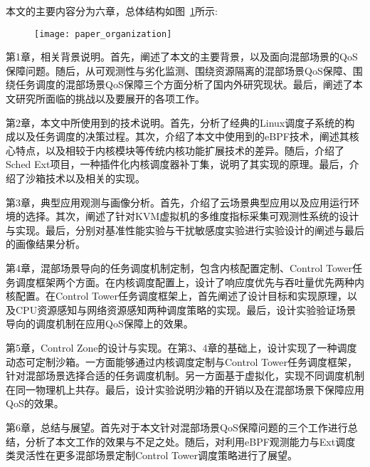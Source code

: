 本文的主要内容分为六章，总体结构如图~\ref{fig:paper_organization}所示:

\begin{figure}[!htbp]
    \centering
    \texttt{[image: paper\_organization]}
    \label{fig:paper_organization}
\end{figure}

第1章，相关背景说明。首先，阐述了本文的主要背景，以及面向混部场景的QoS保障问题。随后，从可观测性与劣化监测、围绕资源隔离的混部场景QoS保障、围绕任务调度的混部场景QoS保障三个方面分析了国内外研究现状。最后，阐述了本文研究所面临的挑战以及要展开的各项工作。

第2章，本文中所使用到的技术说明。首先，分析了经典的Linux调度子系统的构成以及任务调度的决策过程。其次，介绍了本文中使用到的eBPF技术，阐述其核心特点，以及相较于内核模块等传统内核功能扩展技术的差异。随后，介绍了Sched Ext项目，一种插件化内核调度器补丁集，说明了其实现的原理。最后，介绍了沙箱技术以及相关的实现。

第3章，典型应用观测与画像分析。首先，介绍了云场景典型应用以及应用运行环境的选择。其次，阐述了针对KVM虚拟机的多维度指标采集可观测性系统的设计与实现。最后，分别对基准性能实验与干扰敏感度实验进行实验设计的阐述与最后的画像结果分析。

第4章，混部场景导向的任务调度机制定制，包含内核配置定制、Control Tower任务调度框架两个方面。在内核调度配置上，设计了响应度优先与吞吐量优先两种内核配置。在Control Tower任务调度框架上，首先阐述了设计目标和实现原理，以及CPU资源感知与网络资源感知两种调度策略的实现。最后，设计实验验证场景导向的调度机制在应用QoS保障上的效果。

第5章，Control Zone的设计与实现。在第3、4章的基础上，设计实现了一种调度动态可定制沙箱。一方面能够通过内核调度定制与Control Tower任务调度框架，针对混部场景选择合适的任务调度机制。另一方面基于虚拟化，实现不同调度机制在同一物理机上共存。最后，设计实验说明沙箱的开销以及在混部场景下保障应用QoS的效果。

第6章，总结与展望。首先对于本文针对混部场景QoS保障问题的三个工作进行总结，分析了本文工作的效果与不足之处。随后，对利用eBPF观测能力与Ext调度类灵活性在更多混部场景定制Control Tower调度策略进行了展望。